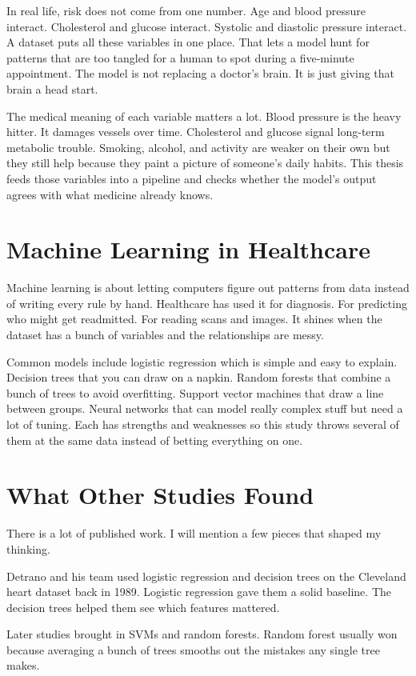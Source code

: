 \documentclass[12pt, a4paper, oneside]{book}
\begin{document}
In real life, risk does not come from one number. Age and blood pressure interact. Cholesterol and glucose interact. Systolic and diastolic pressure interact. A dataset puts all these variables in one place. That lets a model hunt for patterns that are too tangled for a human to spot during a five-minute appointment. The model is not replacing a doctor's brain. It is just giving that brain a head start.

The medical meaning of each variable matters a lot. Blood pressure is the heavy hitter. It damages vessels over time. Cholesterol and glucose signal long-term metabolic trouble. Smoking, alcohol, and activity are weaker on their own but they still help because they paint a picture of someone's daily habits. This thesis feeds those variables into a pipeline and checks whether the model's output agrees with what medicine already knows.

\section{Machine Learning in Healthcare}
Machine learning is about letting computers figure out patterns from data instead of writing every rule by hand. Healthcare has used it for diagnosis. For predicting who might get readmitted. For reading scans and images. It shines when the dataset has a bunch of variables and the relationships are messy.

Common models include logistic regression which is simple and easy to explain. Decision trees that you can draw on a napkin. Random forests that combine a bunch of trees to avoid overfitting. Support vector machines that draw a line between groups. Neural networks that can model really complex stuff but need a lot of tuning. Each has strengths and weaknesses so this study throws several of them at the same data instead of betting everything on one.

\section{What Other Studies Found}
There is a lot of published work. I will mention a few pieces that shaped my thinking.

Detrano and his team used logistic regression and decision trees on the Cleveland heart dataset back in 1989. Logistic regression gave them a solid baseline. The decision trees helped them see which features mattered.

Later studies brought in SVMs and random forests. Random forest usually won because averaging a bunch of trees smooths out the mistakes any single tree makes.
\end{document}
